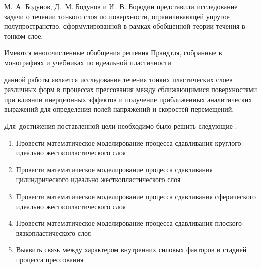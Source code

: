 М.~А. Бодунов, Д.~М. Бодунов и И.~В. Бородин \autocite{Bodunov:2013} представили исследование задачи о течении тонкого слоя по поверхности, ограничивающей упругое полупространство, сформулированной в рамках обобщенной теории течения в тонком слое.

Имеются многочисленные обобщения решения Прандтля, собранные в монографиях и учебниках по идеальной пластичности \autocite{Bikovcev:1998, Browman:1965, Gromov:1978, Gubkin:1959, Hill:1956, Ishlinsky:2001, Ivlev:2001, Ivlev:2002, Kachanov:1969, Kolmogorov:2001, Korolev:1969, Mihin:1968, Nadai:1954, Pavlov:1950, Perlin:1964, Prager:1956, Sokolovskiy:1969, Storozhev:1977, Tarnovsky:1963, Tomlenov:1963, Tomlenov:1972, Tomsen:1965, Tselikov:1965, Tselikov:1965, Unksov:1955, Zadoyan:1992}

\ifsynopsis
\else
\fi


{\aim} данной работы является исследование течения тонких пластических слоев различных форм в процессах прессования между сближающимися поверхностями при влиянии инерционных эффектов и получение приближенных аналитических выражений для определения полей напряжений и скоростей перемещений.

Для~достижения поставленной цели необходимо было решить следующие {\tasks}:
\begin{enumerate}[beginpenalty=10000] %
    \item Провести математическое моделирование процесса сдавливания круглого идеально жесткопластического слоя
    \item Провести математическое моделирование процесса сдавливания цилиндрического идеально жесткопластического слоя
    \item Провести математическое моделирование процесса сдавливания сферического идеально жесткопластического слоя
    \item Провести математическое моделирование процесса сдавливания плоского вязкопластического слоя
    \item Выявить связь между характером внутренних силовых факторов и стадией процесса прессования
\end{enumerate}


